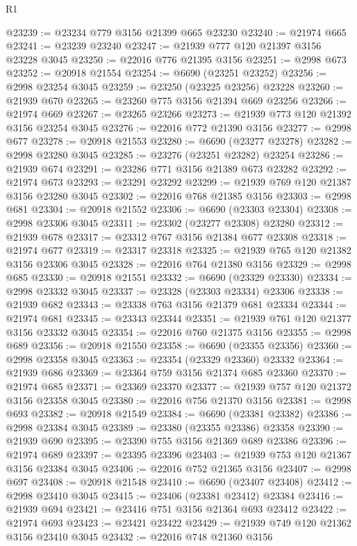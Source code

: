 \begin{lexlean}{R1}
\begin{coremodule}
@23239 := @23234 @779 @3156 @21399 @665 @23230
@23240 := @21974 @665
@23241 := @23239 @23240
@23247 := @21939 @777 @120 @21397 @3156 @23228 @3045
@23250 := @22016 @776 @21395 @3156
@23251 := @2998 @673
@23252 := @20918 @21554
@23254 := @6690 (@23251 @23252)
@23256 := @2998 @23254 @3045
@23259 := @23250 (@23225 @23256) @23228
@23260 := @21939 @670
@23265 := @23260 @775 @3156 @21394 @669 @23256
@23266 := @21974 @669
@23267 := @23265 @23266
@23273 := @21939 @773 @120 @21392 @3156 @23254 @3045
@23276 := @22016 @772 @21390 @3156
@23277 := @2998 @677
@23278 := @20918 @21553
@23280 := @6690 (@23277 @23278)
@23282 := @2998 @23280 @3045
@23285 := @23276 (@23251 @23282) @23254
@23286 := @21939 @674
@23291 := @23286 @771 @3156 @21389 @673 @23282
@23292 := @21974 @673
@23293 := @23291 @23292
@23299 := @21939 @769 @120 @21387 @3156 @23280 @3045
@23302 := @22016 @768 @21385 @3156
@23303 := @2998 @681
@23304 := @20918 @21552
@23306 := @6690 (@23303 @23304)
@23308 := @2998 @23306 @3045
@23311 := @23302 (@23277 @23308) @23280
@23312 := @21939 @678
@23317 := @23312 @767 @3156 @21384 @677 @23308
@23318 := @21974 @677
@23319 := @23317 @23318
@23325 := @21939 @765 @120 @21382 @3156 @23306 @3045
@23328 := @22016 @764 @21380 @3156
@23329 := @2998 @685
@23330 := @20918 @21551
@23332 := @6690 (@23329 @23330)
@23334 := @2998 @23332 @3045
@23337 := @23328 (@23303 @23334) @23306
@23338 := @21939 @682
@23343 := @23338 @763 @3156 @21379 @681 @23334
@23344 := @21974 @681
@23345 := @23343 @23344
@23351 := @21939 @761 @120 @21377 @3156 @23332 @3045
@23354 := @22016 @760 @21375 @3156
@23355 := @2998 @689
@23356 := @20918 @21550
@23358 := @6690 (@23355 @23356)
@23360 := @2998 @23358 @3045
@23363 := @23354 (@23329 @23360) @23332
@23364 := @21939 @686
@23369 := @23364 @759 @3156 @21374 @685 @23360
@23370 := @21974 @685
@23371 := @23369 @23370
@23377 := @21939 @757 @120 @21372 @3156 @23358 @3045
@23380 := @22016 @756 @21370 @3156
@23381 := @2998 @693
@23382 := @20918 @21549
@23384 := @6690 (@23381 @23382)
@23386 := @2998 @23384 @3045
@23389 := @23380 (@23355 @23386) @23358
@23390 := @21939 @690
@23395 := @23390 @755 @3156 @21369 @689 @23386
@23396 := @21974 @689
@23397 := @23395 @23396
@23403 := @21939 @753 @120 @21367 @3156 @23384 @3045
@23406 := @22016 @752 @21365 @3156
@23407 := @2998 @697
@23408 := @20918 @21548
@23410 := @6690 (@23407 @23408)
@23412 := @2998 @23410 @3045
@23415 := @23406 (@23381 @23412) @23384
@23416 := @21939 @694
@23421 := @23416 @751 @3156 @21364 @693 @23412
@23422 := @21974 @693
@23423 := @23421 @23422
@23429 := @21939 @749 @120 @21362 @3156 @23410 @3045
@23432 := @22016 @748 @21360 @3156

\end{coremodule}
\end{lexlean}
